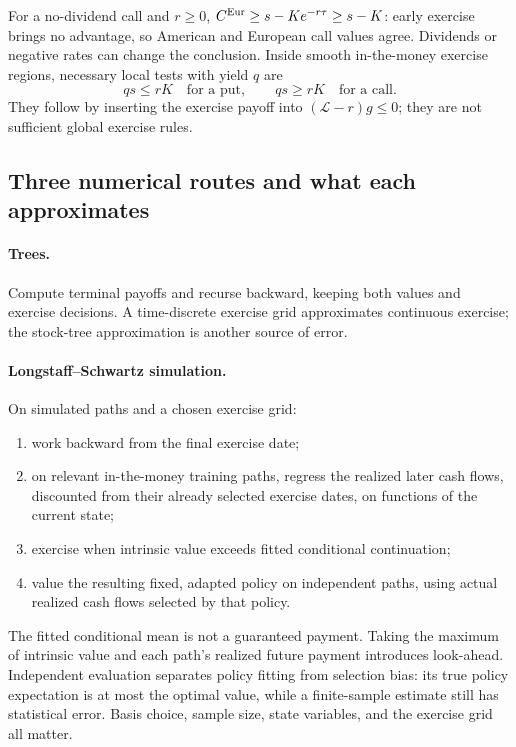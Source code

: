 For a no-dividend call and \(r\geq0\),
\(C^{\rm Eur}\geq s-Ke^{-r\tau}\geq s-K\): early exercise brings no
advantage, so American and European call values agree. Dividends or
negative rates can change the conclusion. Inside smooth in-the-money
exercise regions, necessary local tests with yield \(q\) are
\[
\boxed{qs\leq rK\quad\text{for a put},\qquad
qs\geq rK\quad\text{for a call}.}
\]
They follow by inserting the exercise payoff into
\((\mathcal L-r)g\leq0\); they are not sufficient global exercise rules.

\subsection{Three numerical routes and what each approximates}
\paragraph{Trees.}
Compute terminal payoffs and recurse backward, keeping both values and
exercise decisions. A time-discrete exercise grid approximates continuous
exercise; the stock-tree approximation is another source of error.

\paragraph{Longstaff--Schwartz simulation.}
On simulated paths and a chosen exercise grid:
\begin{enumerate}[leftmargin=1.5em,itemsep=0.15em]
\item work backward from the final exercise date;
\item on relevant in-the-money training paths, regress the realized later
cash flows, discounted from their already selected exercise dates, on
functions of the current state;
\item exercise when intrinsic value exceeds fitted conditional continuation;
\item value the resulting fixed, adapted policy on independent paths,
using actual realized cash flows selected by that policy.
\end{enumerate}
The fitted conditional mean is not a guaranteed payment. Taking the maximum
of intrinsic value and each path's realized future payment introduces
look-ahead. Independent evaluation separates policy fitting from selection
bias: its true policy expectation is at most the optimal value, while a
finite-sample estimate still has statistical error. Basis choice, sample
size, state variables, and the exercise grid all matter.

